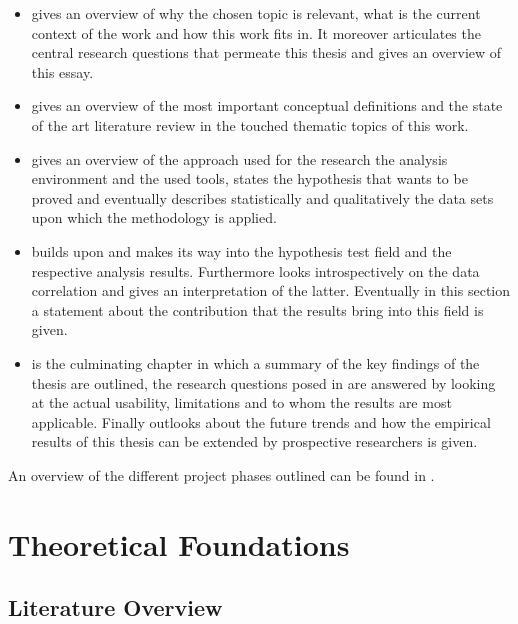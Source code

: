 \documentclass[draft=false]{seal_thesis}
\begin{document}
\begin{itemize}
	\item {} gives an overview of why the chosen topic is relevant, what is the current context of the work and how this work fits in. It moreover articulates the central research questions that permeate this thesis and gives an overview of this essay.
	\item {} gives an overview of the most important conceptual definitions and the state of the art literature review in the touched thematic topics of this work.
	\item {} gives an overview of the approach used for the research \eg the analysis environment and the used tools, states the hypothesis that wants to be proved and eventually describes statistically and qualitatively the data sets upon which the methodology is applied.
	\item {} builds upon  and makes its way into the hypothesis test field and the respective analysis results. Furthermore looks introspectively on the data correlation and gives an interpretation of the latter. Eventually in this section a statement about the contribution that the results bring into this field is given.
	\item {} is the culminating chapter in which a summary of the key findings of the thesis are outlined, the research questions posed in  are answered by looking at the actual usability, limitations and to whom the results are most applicable. Finally outlooks about the future trends and how the empirical results of this thesis can be extended by prospective researchers is given.
\end{itemize}

An overview of the different project phases outlined can be found in .

\glsresetall

\chapter{Theoretical Foundations}
\label{ch:foundations}

\section{Literature Overview}
\label{sec:literature_overview}
\end{document}
